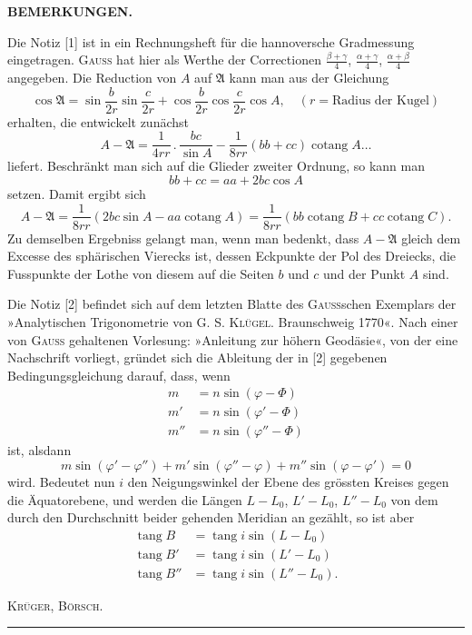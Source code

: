 \vspace*{.11\textheight}
{\small
\begin{center}\textbf{BEMERKUNGEN.}\end{center}

Die Notiz [1] ist in ein Rechnungsheft für die hannoversche Gradmessung eingetragen. \textsc{Gauss} hat
hier als Werthe der Correctionen \(\frac{\beta+\gamma}{4}\), \(\frac{\alpha+\gamma}{4}\), \(\frac{\alpha+\beta}{4}\) angegeben. Die Reduction von \(A\) auf \(\mathfrak A\) kann man
aus der Gleichung
\[
\cos\mathfrak A=\sin\frac b{2r}\sin\frac c{2r}
+\cos\frac b{2r}\cos\frac c{2r}\cos A,\quad (r=\text{Radius der Kugel})
\]
\noindent erhalten, die entwickelt zunächst
\[
A-\mathfrak A=\frac1{4rr}\,.\,\frac{bc}{\sin A}
-\frac1{8rr}(bb+cc)\operatorname{cotang}A\ldots
\]
\noindent liefert. Beschränkt man sich auf die Glieder zweiter Ordnung, so kann man
\[
bb+cc=aa+2bc\cos A
\]
\noindent setzen. Damit ergibt sich
\[
A-\mathfrak A=\frac1{8rr}(2bc\sin A-aa\operatorname{cotang}A)
=\frac1{8rr}(bb\operatorname{cotang}B+cc\operatorname{cotang}C).
\]
\noindent Zu demselben Ergebniss gelangt man, wenn man bedenkt, dass \(A-\mathfrak A\) gleich dem Excesse des sphärischen
Vierecks ist, dessen Eckpunkte der Pol des Dreiecks, die Fusspunkte der Lothe von diesem auf die Seiten
\(b\) und \(c\) und der Punkt \(A\) sind.

Die Notiz [2] befindet sich auf dem letzten Blatte des \textsc{Gauss}schen Exemplars der »Analytischen
Trigonometrie von G. S. \textsc{Klügel}. Braunschweig 1770«. Nach einer von \textsc{Gauss} gehaltenen Vorlesung:
»Anleitung zur höhern Geodäsie«, von der eine Nachschrift vorliegt, gründet sich die Ableitung der in [2]
gegebenen Bedingungsgleichung darauf, dass, wenn
\[
\begin{aligned}
m&=n\sin(\varphi-\Phi)\\
m'&=n\sin(\varphi'-\Phi)\\
m''&=n\sin(\varphi''-\Phi)
\end{aligned}
\]
\noindent ist, alsdann
\[
m\sin(\varphi'-\varphi'')+m'\sin(\varphi''-\varphi)+m''\sin(\varphi-\varphi')=0
\]
\noindent wird. Bedeutet nun \(i\) den Neigungswinkel der Ebene des grössten Kreises gegen die Äquatorebene, und
werden die Längen \(L-L_0\), \(L'-L_0\), \(L''-L_0\) von dem durch den Durchschnitt beider gehenden Meridian
an gezählt, so ist aber
\[
\begin{aligned}
\operatorname{tang}B&=\operatorname{tang}i\sin(L-L_0)\\
\operatorname{tang}B'&=\operatorname{tang}i\sin(L'-L_0)\\
\operatorname{tang}B''&=\operatorname{tang}i\sin(L''-L_0).
\end{aligned}
\]
\par\hfill\textsc{Krüger, Börsch.}\hspace{.06\textwidth}\par
}
\begin{center}\rule{.24\textwidth}{.4pt}\end{center}

